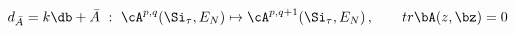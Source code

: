 \begin{equation}
d_{\bar A} =k\db + \bar A ~:~ \cA^{p,q}(\Si_{\tau}, E_N)
\mapsto \cA^{p,q+1}(\Si_{\tau}, E_N)\,, \qquad tr \bA(z,\bz)=0
\label{dbar}
\end{equation}


